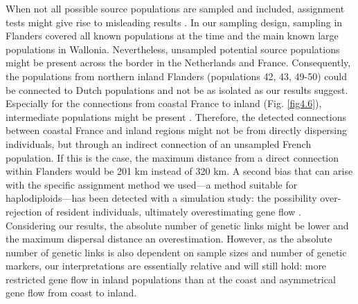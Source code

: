 \documentclass[10pt, twoside]{book} %
\begin{document}
	When not all possible source populations are sampled and included, assignment tests might give rise to misleading results \citep{rannala1997, cornuet1999}. In our sampling design, sampling in Flanders covered all known populations at the time and the main known large populations in Wallonia. Nevertheless, unsampled potential source populations might be present across the border in the Netherlands and France. Consequently, the populations from northern inland Flanders (populations 42, 43, 49-50) could be connected to Dutch populations and not be as isolated as our results suggest. Especially for the connections from coastal France to inland (Fig. \ref{fig4.6}), intermediate populations might be present \citep{bitsch1997, barbier2007}. Therefore, the detected connections between coastal France and inland regions might not be from directly dispersing individuals, but through an indirect connection of an unsampled French population. If this is the case, the maximum distance from a direct connection within Flanders would be 201 km instead of 320 km. A second bias that can arise with the specific assignment method we used---a method suitable for haplodiploids---has been detected with a simulation study: the possibility over-rejection of resident individuals, ultimately overestimating gene flow \citep{paetkau2004, piry2004}. Considering our results, the absolute number of genetic links might be lower and the maximum dispersal distance an overestimation. However, as the absolute number of genetic links is also dependent on sample sizes and number of genetic markers, our interpretations are essentially relative and will still hold: more restricted gene flow in inland populations than at the coast and asymmetrical gene flow from coast to inland.\\
	
\end{document}
